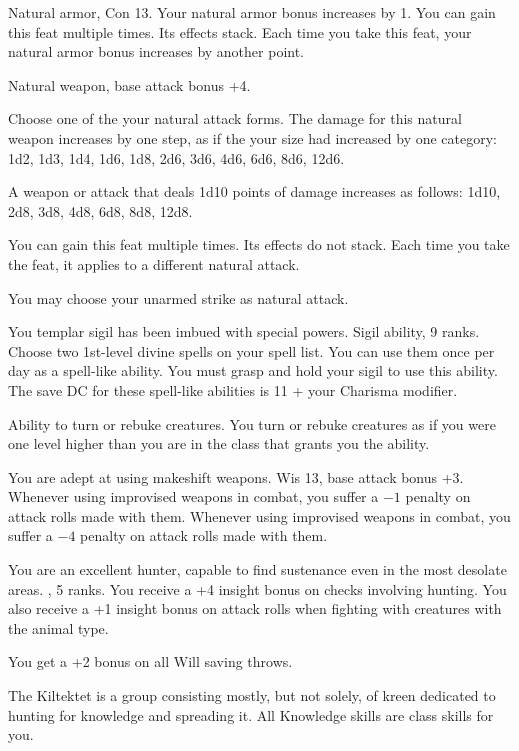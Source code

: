 {}
{Natural armor, Con 13.}
{Your natural armor bonus increases by 1.}
{}
{You can gain this feat multiple times. Its effects stack. Each time you take this feat, your natural armor bonus increases by another point.}

{}
{Natural weapon, base attack bonus +4.}
{Choose one of the your natural attack forms. The damage for this natural weapon increases by one step, as if the your size had increased by one category: 1d2, 1d3, 1d4, 1d6, 1d8, 2d6, 3d6, 4d6, 6d6, 8d6, 12d6.

A weapon or attack that deals 1d10 points of damage increases as follows: 1d10, 2d8, 3d8, 4d8, 6d8, 8d8, 12d8.}
{}
{You can gain this feat multiple times. Its effects do not stack. Each time you take the feat, it applies to a different natural attack.

You may choose your unarmed strike as natural attack.}

{You templar sigil has been imbued with special powers.}
{Sigil ability,  9 ranks.}
{Choose two 1st-level divine spells on your spell list. You can use them once per day as a spell-like ability. You must grasp and hold your sigil to use this ability. The save DC for these spell-like abilities is 11 + your Charisma modifier.}{}{}

{Ability to turn or rebuke creatures.}
{You turn or rebuke creatures as if you were one level higher than you are in the class that grants you the ability.}

{You are adept at using makeshift weapons.}
{Wis 13, base attack bonus +3.}
{Whenever using improvised weapons in combat, you suffer a $-1$ penalty on attack rolls made with them.}
{Whenever using improvised weapons in combat, you suffer a $-4$ penalty on attack rolls made with them.}{}

{You are an excellent hunter, capable to find sustenance even in the most desolate areas.}
{,  5 ranks.}
{You receive a +4 insight bonus on  checks involving hunting. You also receive a +1 insight bonus on attack rolls when fighting with creatures with the animal type.}{}{}

{You get a +2 bonus on all Will saving throws.}

{The Kiltektet is a group consisting mostly, but not solely, of kreen dedicated to hunting for knowledge and spreading it.}{}
{All Knowledge skills are class skills for you.}{}{}

